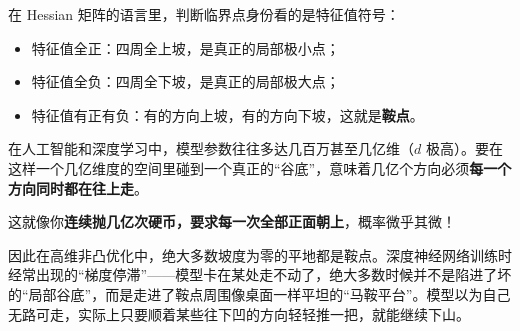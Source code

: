 在 Hessian 矩阵的语言里，判断临界点身份看的是特征值符号：
\begin{itemize}
    \item 特征值全正：四周全上坡，是真正的局部极小点；
    \item 特征值全负：四周全下坡，是真正的局部极大点；
    \item 特征值有正有负：有的方向上坡，有的方向下坡，这就是\textbf{鞍点}。
\end{itemize}

在人工智能和深度学习中，模型参数往往多达几百万甚至几亿维（\(d\) 极高）。要在这样一个几亿维度的空间里碰到一个真正的``谷底''，意味着几亿个方向必须\textbf{每一个方向同时都在往上走}。

这就像你\textbf{连续抛几亿次硬币，要求每一次全部正面朝上}，概率微乎其微！

因此在高维非凸优化中，绝大多数坡度为零的平地都是鞍点。深度神经网络训练时经常出现的``梯度停滞''——模型卡在某处走不动了，绝大多数时候并不是陷进了坏的``局部谷底''，而是走进了鞍点周围像桌面一样平坦的``马鞍平台''。模型以为自己无路可走，实际上只要顺着某些往下凹的方向轻轻推一把，就能继续下山。


